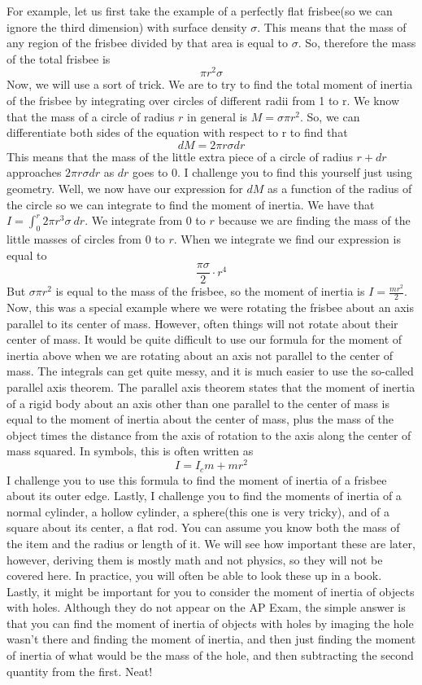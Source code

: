 \documentclass{article}[gray]
\numberwithin{equation}{subsection}
\begin{document}
For example, let us first take the example of a perfectly flat frisbee(so we can ignore the third dimension) with surface density $\sigma$. This means that the mass of any region of the frisbee divided by that area is equal to $\sigma$. So, therefore the mass of the total frisbee is $$\pi r^2 \sigma$$ Now, we will use a sort of trick. We are to try to find the total moment of inertia of the frisbee by integrating over circles of different radii from 1 to r. We know that the mass of a circle of radius $r$ in general is $M=\sigma \pi r^2$. So, we can differentiate both sides of the equation with respect to r to find that \begin{equation}dM= 2\pi r \sigma dr\end{equation} This means that the mass of the little extra piece of a circle of radius $r+dr$ approaches $2\pi r \sigma dr$ as $dr$ goes to 0. I challenge you to find this yourself just using geometry. Well, we now have our expression for $dM$ as a function of the radius of the circle so we can integrate to find the moment of inertia. We have that $I= \int_{0}^{r} 2\pi r^3 \sigma \ dr$. We integrate from $0$ to $r$ because we are finding the mass of the little masses of circles from $0$ to $r$. When we integrate we find our expression is equal to $$\frac{\pi \sigma}{2} \cdot r^4$$ But $\sigma \pi r^2$ is equal to the mass of the frisbee, so the moment of inertia is $I = \frac{mr^2}{2}$. Now, this was a special example where we were rotating the frisbee about an axis parallel to its center of mass. However, often things will not rotate about their center of mass. It would be quite difficult to use our formula for the moment of inertia above when we are rotating about an axis not parallel to the center of mass. The integrals can get quite messy, and it is much easier to use the so-called parallel axis theorem. The parallel axis theorem states that the moment of inertia of a rigid body about an axis other than one parallel to the center of mass is equal to the moment of inertia about the center of mass, plus the mass of the object times the distance from the axis of rotation to the axis along the center of mass squared. In symbols, this is often written as \begin{equation}I=I_cm+mr^2\end{equation} I challenge you to use this formula to find the moment of inertia of a frisbee about its outer edge. Lastly, I challenge you to find the moments of inertia of a normal cylinder, a hollow cylinder, a sphere(this one is very tricky), and of a square about its center, a flat rod. You can assume you know both the mass of the item and the radius or length of it. We will see how important these are later, however, deriving them is mostly math and not physics, so they will not be covered here. In practice, you will often be able to look these up in a book. Lastly, it might be important for you to consider the moment of inertia of objects with holes. Although they do not appear on the AP Exam, the simple answer is that you can find the moment of inertia of objects with holes by imaging the hole wasn’t there and finding the moment of inertia, and then just finding the moment of inertia of what would be the mass of the hole, and then subtracting the second quantity from the first. Neat!
\end{document}
